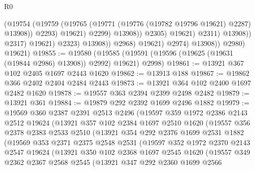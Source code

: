 \begin{lexlean}{R0}
\begin{coremodule}
                                            (@19754
                                              (@19759
                                                (@19765
                                                  (@19771
                                                    (@19776 (@19782 @19796 @19621) @2287)
                                                    @13908))
                                                @2293)
                                              @19621)
                                            @2299)
                                          @13908))
                                      @2305)
                                    @19621)
                                  @2311)
                                @13908))
                            @2317)
                          @19621)
                        @2323)
                      @13908))
                  @2968)
                @19621)
              @2974)
            @13908))
        @2980)
      @19621)
@19855 := @19580
    (@19585 (@19591 (@19596 (@19625 (@19631 (@19844 @2986) @13908)) @2992) @19621) @2998)
@19861 := @13921 @367 @102 @2405 @1697 @2443 @1620
@19862 := @13913 @188
@19867 := @19862 @366 @2402 @2404 @2484 @2443
@19873 := @13921 @364 @102 @2400 @1697 @2482 @1620
@19878 := @19557 @363 @2394 @2399 @2498 @2482
@19879 := @13921 @361
@19884 := @19879 @292 @2392 @1699 @2496 @1882
@19979 := @19569
    @360
    @2387
    @2391
    @2513
    @2496
    (@19597
      @359
      @1972
      @2386
      @2143
      @2512
      @19624
      (@13921
        @357
        @102
        @2384
        @1697
        @2510
        @1620
        (@19557
          @356
          @2378
          @2383
          @2533
          @2510
          (@13921
            @354
            @292
            @2376
            @1699
            @2531
            @1882
            (@19569
              @353
              @2371
              @2375
              @2548
              @2531
              (@19597
                @352
                @1972
                @2370
                @2143
                @2547
                @19624
                (@13921
                  @350
                  @102
                  @2368
                  @1697
                  @2545
                  @1620
                  (@19557
                    @349
                    @2362
                    @2367
                    @2568
                    @2545
                    (@13921
                      @347
                      @292
                      @2360
                      @1699
                      @2566

\end{coremodule}
\end{lexlean}
